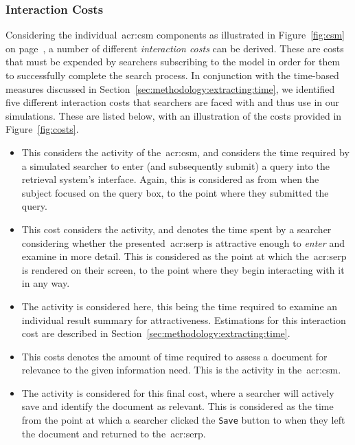 \subsubsection{Interaction Costs}\label{sec:method:simulation:grounding:costs}
Considering the individual~\gls{acr:csm} components as illustrated in Figure~\ref{fig:csm} on page~\pageref{fig:csm}, a number of different \emph{interaction costs} can be derived. These are costs that must be expended by searchers subscribing to the model in order for them to successfully complete the search process. In conjunction with the time-based measures discussed in Section~\ref{sec:methodology:extracting:time}, we identified five different interaction costs that searchers are faced with and thus use in our simulations. These are listed below, with an illustration of the costs provided in Figure~\ref{fig:costs}.

\begin{itemize}
    \item{ This considers the  activity of the~\gls{acr:csm}, and considers the time required by a simulated searcher to enter (and subsequently submit) a query into the retrieval system's interface. Again, this is considered as from when the subject focused on the query box, to the point where they submitted the query.}
    \item{ This cost considers the  activity, and denotes the time spent by a searcher considering whether the presented~\gls{acr:serp} is attractive enough to \emph{enter} and examine in more detail. This is considered as the point at which the~\gls{acr:serp} is rendered on their screen, to the point where they begin interacting with it in any way.}
    \item{ The  activity is considered here, this being the time required to examine an individual result summary for attractiveness. Estimations for this interaction cost are described in Section~\ref{sec:methodology:extracting:time}.}
    \item{ This costs denotes the amount of time required to assess a document for relevance to the given information need. This is the  activity in the~\gls{acr:csm}.}
    \item{ The  activity is considered for this final cost, where a searcher will actively save and identify the document as relevant. This is considered as the time from the point at which a searcher clicked the \texttt{Save} button to when they left the document and returned to the~\gls{acr:serp}.}
\end{itemize}

